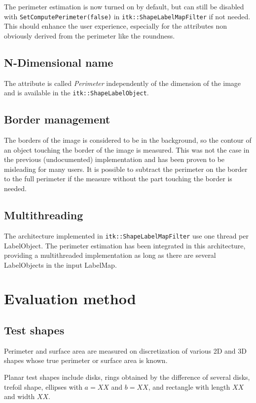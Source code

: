 \documentclass{InsightArticle}
\begin{document}
The perimeter estimation is now turned on by default, but can still be disabled with \verb$SetComputePerimeter(false)$ in
\verb$itk::ShapeLabelMapFilter$ if not needed. This should enhance the user experience, especially for the attributes non obviously derived
from the perimeter like the roundness.

\subsection{N-Dimensional name}
The attribute is called {\em Perimeter} independently of the dimension of the image and is available in the \verb$itk::ShapeLabelObject$.

\subsection{Border management}

The borders of the image is considered to be in the background, so the contour of an object touching the border of the image is measured.
This was not the case in the previous (undocumented) implementation and has been proven to be misleading for many users.
It is possible to subtract the perimeter on the border to the full perimeter if the measure without the part touching the border is needed.

\subsection{Multithreading}

The architecture implemented in \verb$itk::ShapeLabelMapFilter$ use one thread per LabelObject. The perimeter estimation has been integrated in this
architecture, providing a multithreaded implementation as long as there are several LabelObjects in the input LabelMap.


\section{Evaluation method}

\subsection{Test shapes}

Perimeter and surface area are measured on discretization of various 2D and 3D shapes 
whose true perimeter or surface area is known.

Planar test shapes include disks, rings obtained by the difference of several disks,
trefoil shape, ellipses with $a=XX$ and $b=XX$, and rectangle with length $XX$ and width $XX$.
\end{document}
